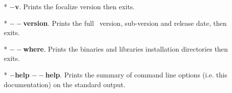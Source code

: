 \begin{itemize}
  \item[*] {\bf $-$v}. Prints the focalize version then exits.

  \item[*] {\bf $--$version}. Prints the full \focal\ version,
    sub-version and release date, then exits.

  \item[*] {\bf $--$where}. Prints the binaries and libraries
    installation directories then exits.

  \item[*] {\bf $-$help} {\bf $--$help}. Prints the summary of command
    line options (i.e. this documentation) on the standard output.
\end{itemize}
